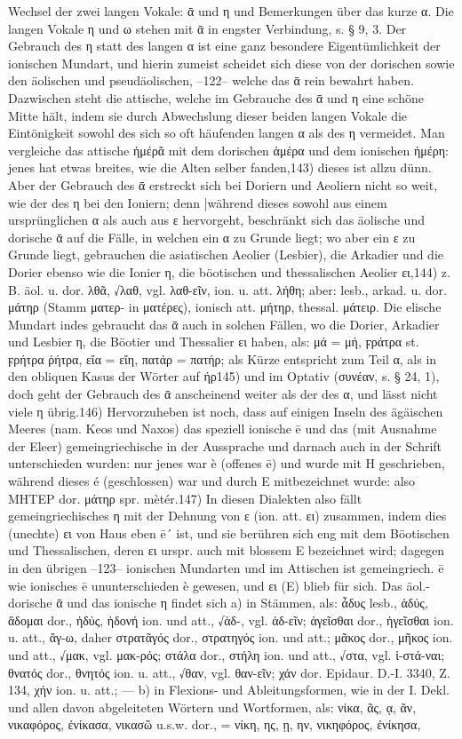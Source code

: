Wechsel der zwei langen Vokale: ᾱ und η und Bemerkungen über das kurze α. Die langen Vokale η und ω stehen mit ᾱ in engster Verbindung, s. § 9, 3. Der Gebrauch des η statt des langen α ist eine ganz besondere Eigentümlichkeit der ionischen Mundart, und hierin zumeist scheidet sich diese von der dorischen sowie den äolischen und pseudäolischen, --122-- welche das ᾱ rein bewahrt haben. Dazwischen steht die attische, welche im Gebrauche des ᾱ und η eine schöne Mitte hält, indem sie durch Abwechslung dieser beiden langen Vokale die Eintönigkeit sowohl des sich so oft häufenden langen α als des η vermeidet. Man vergleiche das attische ἡμέρᾶ mit dem dorischen ἁμέρα und dem ionischen ἡμέρη: jenes hat etwas breites, wie die Alten selber fanden,143) dieses ist allzu dünn. Aber der Gebrauch des ᾱ erstreckt sich bei Doriern und Aeoliern nicht so weit, wie der des η bei den Ioniern; denn |während dieses sowohl aus einem ursprünglichen α als auch aus ε hervorgeht, beschränkt sich das äolische und dorische ᾱ auf die Fälle, in welchen ein α zu Grunde liegt; wo aber ein ε zu Grunde liegt, gebrauchen die asiatischen Aeolier (Lesbier), die Arkadier und die Dorier ebenso wie die Ionier η, die böotischen und thessalischen Aeolier ει,144) z. B. äol. u. dor. λθᾶ, √λαθ, vgl. λαθ-εῖν, ion. u. att. λήθη; aber: lesb., arkad. u. dor. μάτηρ (Stamm ματερ- in ματέρες), ionisch att. μήτηρ,  thessal. μάτειρ. Die elische Mundart indes gebraucht das ᾱ auch in solchen Fällen, wo die Dorier, Arkadier und Lesbier η, die Böotier und Thessalier ει haben, als: μά = μή, ϝράτρα st. ϝρήτρα ῥήτρα, εἴα = εἴη, πατάρ = πατήρ; als Kürze entspricht zum Teil α, als in den obliquen Kasus der Wörter auf ήρ145) und im Optativ (συνέαν, s. § 24, 1), doch geht der Gebrauch des ᾱ anscheinend weiter als der des α, und lässt nicht viele η übrig.146) Hervorzuheben ist noch, dass auf einigen Inseln des ägäischen Meeres (nam. Keos und Naxos) das speziell ionische ē und das (mit Ausnahme der Eleer) gemeingriechische in der Aussprache und darnach auch in der Schrift unterschieden wurden: nur jenes war è (offenes ē) und wurde mit Η geschrieben, während dieses é (geschlossen) war und durch Ε mitbezeichnet wurde: also ΜΗΤΕΡ dor. μάτηρ spr. mètér.147) In diesen Dialekten also fällt gemeingriechisches η mit der Dehnung von ε (ion. att. ει) zusammen, indem dies (unechte) ει von Haus eben ē´ ist, und sie berühren sich eng mit dem Böotischen und Thessalischen, deren ει urspr. auch mit blossem Ε bezeichnet wird; dagegen in den übrigen --123-- ionischen Mundarten und im Attischen ist gemeingriech. ē wie ionisches ē ununterschieden è gewesen, und ει (Ε) blieb für sich. Das äol.-dorische ᾱ und das ionische η findet sich a) in Stämmen, als: ἆδυς lesb., ἁδύς, ἅδομαι dor., ἡδύς, ἡδονή ion. und att., √ἁδ-, vgl. ἁδ-εῖν; ἁγεῖσθαι dor., ἡγεῖσθαι ion. u. att., ἄγ-ω, daher στρατᾶγός dor., στρατηγός ion. und att.; μᾶκος dor., μῆκος ion. und att., √μακ, vgl. μακ-ρός; στάλα dor., στήλη ion. und att., √στα, vgl. ἱ-στά-ναι; θνατός dor., θνητός ion. u. att., √θαν, vgl. θαν-εῖν; χάν dor. Epidaur. D.-I. 3340, Z. 134, χήν ion. u. att.; — b) in Flexions- und Ableitungsformen, wie in der I. Dekl. und allen davon abgeleiteten Wörtern und Wortformen, als: νίκα, ᾶς, ᾳ, ᾶν, νικαφόρος, ἐνίκασα, νικασῶ u.s.w. dor., = νίκη, ης, ῃ, ην, νικηφόρος, ἐνίκησα, 